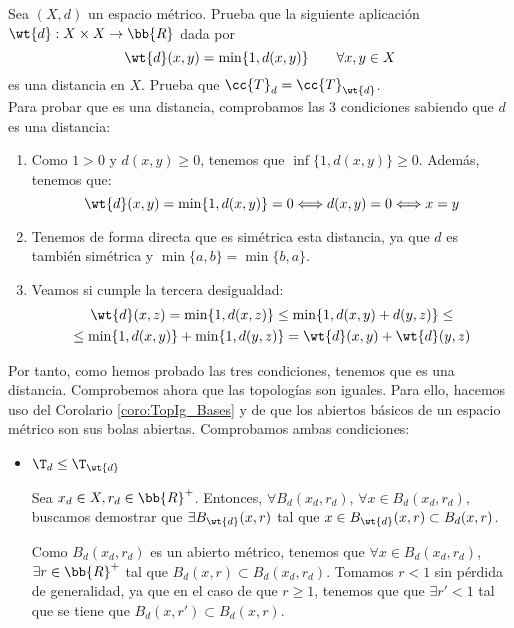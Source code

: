 \begin{ejercicio}
    Sea $(X,d)$ un espacio métrico. Prueba que la siguiente aplicación $\wt{d}:X\times X\to \bb{R}$ dada por
    \begin{equation*}
        \wt{d}(x,y)=\min\{1,d(x,y)\} \qquad \forall x,y\in X
    \end{equation*}
    es una distancia en $X$. Prueba que $\cc{T}_d=\cc{T}_{\wt{d}}$.\\

    Para probar que es una distancia, comprobamos las 3 condiciones sabiendo que $d$ es una distancia:
    \begin{enumerate}
        \item Como $1>0$ y $d(x,y)\geq 0$, tenemos que $\inf\{1,d(x,y)\}\geq 0$. Además, tenemos que:
        \begin{equation*}
            \wt{d}(x,y)=\min\{1,d(x,y)\} = 0 \Longleftrightarrow d(x,y)=0 \Longleftrightarrow x=y
        \end{equation*}

        \item Tenemos de forma directa que es simétrica esta distancia, ya que $d$ es también simétrica y $\min\{a,b\}=\min\{b,a\}$.

        \item Veamos si cumple la tercera desigualdad:
        \begin{multline*}
            \wt{d}(x,z) = \min\{1,d(x,z)\} \leq \min\{1,d(x,y)+d(y,z)\} \leq \\\leq \min\{1,d(x,y)\}  + \min\{1,d(y,z)\} = \wt{d}(x,y) +  \wt{d}(y,z)
        \end{multline*}
    \end{enumerate}

    Por tanto, como hemos probado las tres condiciones, tenemos que es una distancia. Comprobemos ahora que las topologías son iguales. Para ello, hacemos uso del Corolario \ref{coro:TopIg_Bases} y de que los abiertos básicos de un espacio métrico son sus bolas abiertas. Comprobamos ambas condiciones:
    \begin{itemize}
        \item \ul{$\T_d\leq \T_{\wt{d}}$}

        Sea $x_d\in X, r_d\in \bb{R}^+$. Entonces, $\forall B_d(x_d,r_d)$, $\forall x\in B_d(x_d,r_d)$, buscamos demostrar que $\exists B_{\wt{d}}(x,r)$ tal que $x\in B_{\wt{d}}(x,r)\subset B_d(x,r)$.

        Como $B_d(x_d,r_d)$ es un abierto métrico, tenemos que $\forall x\in B_d(x_d,r_d)$, $\exists r\in \bb{R}^+$ tal que $B_d(x,r)\subset B_d(x_d,r_d)$. Tomamos $r<1$ sin pérdida de generalidad, ya que en el caso de que $r\geq 1$, tenemos que que $\exists r'<1$ tal que se tiene que $B_d(x,r')\subset B_d(x,r)$.


\end{itemize}
\end{ejercicio}
